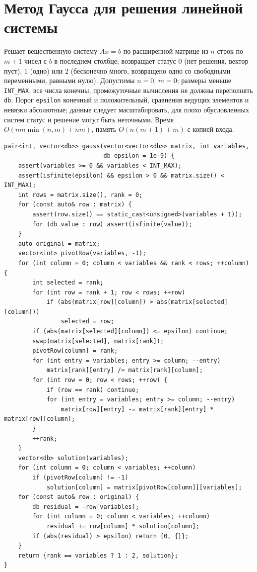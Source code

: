 \section{Метод Гаусса для решения линейной системы}
Решает вещественную систему $Ax=b$ по расширенной матрице из $n$ строк по $m+1$ чисел с $b$ в последнем столбце; возвращает статус $0$ (нет решения, вектор пуст), $1$ (одно) или $2$ (бесконечно много, возвращено одно со свободными переменными, равными нулю).
Допустимы $n=0$, $m=0$; размеры меньше \texttt{INT\_MAX}, все числа конечны, промежуточные вычисления не должны переполнять \texttt{db}.
Порог \texttt{epsilon} конечный и положительный, сравнения ведущих элементов и невязки абсолютные; данные следует масштабировать, для плохо обусловленных систем статус и решение могут быть неточными.
Время $O(nm\min(n,m)+nm)$, память $O(n(m+1)+m)$ с копией входа.
\begin{lstlisting}[name=math_gauss]
pair<int, vector<db>> gauss(vector<vector<db>> matrix, int variables,
                            db epsilon = 1e-9) {
    assert(variables >= 0 && variables < INT_MAX);
    assert(isfinite(epsilon) && epsilon > 0 && matrix.size() < INT_MAX);
    int rows = matrix.size(), rank = 0;
    for (const auto& row : matrix) {
        assert(row.size() == static_cast<unsigned>(variables + 1));
        for (db value : row) assert(isfinite(value));
    }
    auto original = matrix;
    vector<int> pivotRow(variables, -1);
    for (int column = 0; column < variables && rank < rows; ++column) {
        int selected = rank;
        for (int row = rank + 1; row < rows; ++row)
            if (abs(matrix[row][column]) > abs(matrix[selected][column]))
                selected = row;
        if (abs(matrix[selected][column]) <= epsilon) continue;
        swap(matrix[selected], matrix[rank]);
        pivotRow[column] = rank;
        for (int entry = variables; entry >= column; --entry)
            matrix[rank][entry] /= matrix[rank][column];
        for (int row = 0; row < rows; ++row) {
            if (row == rank) continue;
            for (int entry = variables; entry >= column; --entry)
                matrix[row][entry] -= matrix[rank][entry] * matrix[row][column];
        }
        ++rank;
    }
    vector<db> solution(variables);
    for (int column = 0; column < variables; ++column)
        if (pivotRow[column] != -1)
            solution[column] = matrix[pivotRow[column]][variables];
    for (const auto& row : original) {
        db residual = -row[variables];
        for (int column = 0; column < variables; ++column)
            residual += row[column] * solution[column];
        if (abs(residual) > epsilon) return {0, {}};
    }
    return {rank == variables ? 1 : 2, solution};
}
\end{lstlisting}
